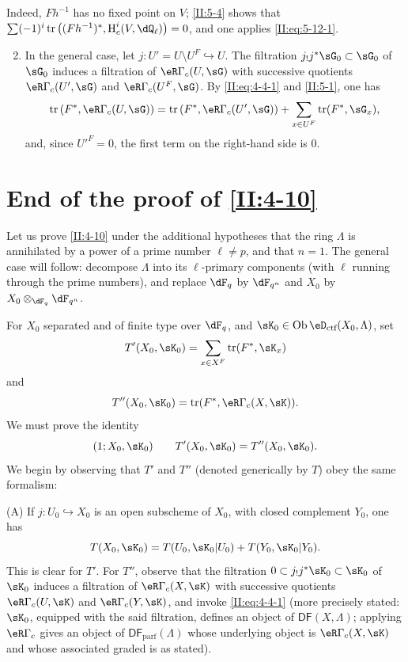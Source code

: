 Indeed, $F h^{-1}$ has no fixed point on $V$; \ref{II:5-4} shows that
$\sum (-1)^i \tr\left((F h^{-1})^*,\h_c^i(V,\dQ_\ell)\right)=0$, and one
applies \eqref{II:eq:5-12-1}.
\begin{enumerate}[\indent A.]
\setcounter{enumi}{1}
  \item In the general case, let $j:U'=U\setminus U^F\hookrightarrow U$.
    The filtration $j_! j^* \sG_0\subset \sG_0$ of $\sG_0$ induces a
    filtration of $\eR\Gamma_c(U,\sG)$ with successive quotients
    $\eR\Gamma_c(U',\sG)$ and $\eR\Gamma_c(U^F,\sG)$. By
    \eqref{II:eq:4-4-1} and \ref{II:5-1}, one has
    \[
      \tr\left(F^*,\eR\Gamma_c(U,\sG)\right) = \tr\left(F^*,\eR\Gamma_c(U',\sG)\right) + \sum_{x\in U^F} \tr(F^*,\sG_x) \text{,}
    \]
    and, since ${U'}^F=0$, the first term on the right-hand side is $0$.
\end{enumerate}











\section{End of the proof of \ref{II:4-10}}\label{II:6}

Let us prove \ref{II:4-10} under the additional hypotheses that the ring
$\Lambda$ is annihilated by a power of a prime number $\ell\ne p$, and that
$n=1$. The general case will follow: decompose $\Lambda$ into its
$\ell$-primary components (with $\ell$ running through the prime numbers),
and replace $\dF_q$ by $\dF_{q^n}$ and $X_0$ by
$X_0\otimes_{\dF_q}\dF_{q^n}$.

For $X_0$ separated and of finite type over $\dF_q$, and
$\sK_0\in\ob\eD_\text{ctf}(X_0,\Lambda)$, set
\[
  T'(X_0,\sK_0) = \sum_{x\in X^F} \tr(F^*,\sK_x)
\]
and
\[
  T''(X_0,\sK_0) = \tr(F^*,\eR\Gamma_c(X,\sK)) \text{.}
\]
We must prove the identity
\[
  (1;X_0,\sK_0) \qquad T'(X_0,\sK_0) = T''(X_0,\sK_0) \text{.}
\]
We begin by observing that $T'$ and $T''$ (denoted generically by $T$) obey
the same formalism:

(A) If $j:U_0\hookrightarrow X_0$ is an open subscheme of $X_0$, with
closed complement $Y_0$, one has
\[
  T(X_0,\sK_0) = T(U_0,\sK_0|U_0) + T(Y_0,\sK_0|Y_0) \text{.}
\]
This is clear for $T'$. For $T''$, observe that the filtration
$0\subset j_! j^* \sK_0\subset \sK_0$ of $\sK_0$ induces a filtration of
$\eR\Gamma_c(X,\sK)$ with successive quotients $\eR\Gamma_c(U,\sK)$ and
$\eR\Gamma_c(Y,\sK)$, and invoke \eqref{II:eq:4-4-1} (more precisely stated:
$\sK_0$, equipped with the said filtration, defines an object of
$\mathsf{DF}(X,\Lambda)$; applying $\eR\Gamma_c$ gives an object of
$\mathsf{DF}_\text{parf}(\Lambda)$ whose underlying object is
$\eR\Gamma_c(X,\sK)$ and whose associated graded is as stated).

